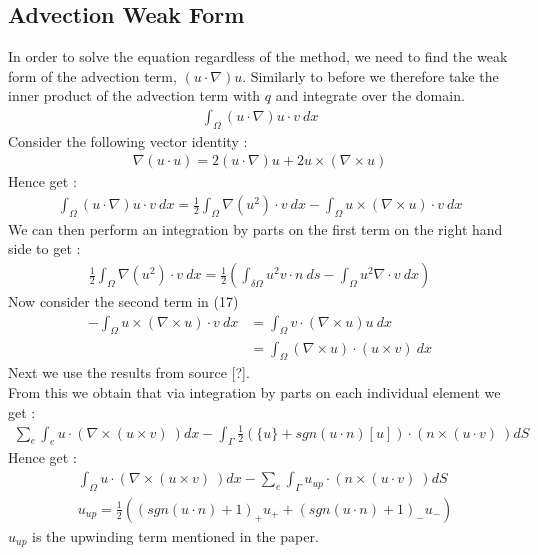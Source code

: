 \documentclass[11pt,twoside,a4paper]{article}
\begin{document}
\subsection{Advection Weak Form}
In order to solve the equation regardless of the method, we need to find the weak form of the advection term, $(u \cdot \nabla) u$.
Similarly to before we therefore take the inner product of the advection term with $q$ and integrate over the domain.
\begin{align}
\int_\Omega (u \cdot \nabla)u \cdot v \ dx
\end{align}
Consider the following vector identity :
\begin{align*}
\nabla (u \cdot u) = 2 (u \cdot \nabla) u + 2 u \times (\nabla \times u) 
\end{align*}
Hence get : 
\begin{align}
\int_\Omega (u \cdot \nabla)u \cdot v \ dx = \frac{1}{2} \int_\Omega \nabla (u^2) \cdot v \ dx - \int_{\Omega} u \times (\nabla \times u) \cdot v \ dx
\end{align}
We can then perform an integration by parts on the first term on the right hand side to get :
\begin{align}
 \frac{1}{2} \int_\Omega \nabla (u^2) \cdot v \ dx = \frac{1}{2} (\int_{\delta \Omega } u^2 v \cdot n \ ds - \int_\Omega u^2 \nabla \cdot v \ dx)
\end{align}
Now consider the second term in (17)
\begin{align*}
- \int_{\Omega} u \times (\nabla \times u) \cdot v \ dx &= \int_{\Omega} v \cdot (\nabla \times u) u \ dx   \\
&=  \int_{\Omega} (\nabla \times u) \cdot (u \times v)  \ dx
\end{align*}
Next we use the results from source [?].\\
From this we obtain that via integration by parts on each individual element we get : 
\begin{align*}
\sum_e \int_e u \cdot (\nabla \times (u \times v) \ ) dx - \int_{\Gamma} \frac{1}{2}(\{u\} + sgn(u \cdot n)[u]) \cdot (n \times (u \cdot v) \ ) dS
\end{align*}
Hence get :
\begin{align}
&\int_\Omega u \cdot (\nabla \times (u \times v) \ ) dx -  \sum_e \int_{\Gamma} u_{up} \cdot (n \times (u \cdot v) \ ) dS \\
& u_{up} = \frac{1}{2}((sgn(u \cdot n) + 1)_+ u_+ + (sgn (u \cdot n) +1)_- u_-)
\end{align}
$u_{up}$ is the upwinding term mentioned in the paper.\\
\end{document}
